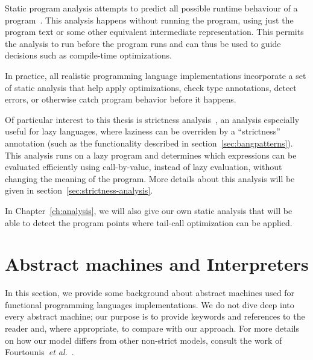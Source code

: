 \documentclass[diploma]{softlab-thesis}
\begin{document}


Static program analysis attempts to predict all possible runtime
behaviour of a program~\cite{Nielson:2010:PPA:1965094}. This analysis
happens without running the program, using just the program text or
some other equivalent intermediate representation. This permits the analysis to
run before the program runs and can thus be used to guide decisions
such as compile-time optimizations.

In practice, all realistic programming language implementations
incorporate a set of static analysis that help apply optimizations,
check type annotations, detect errors, or otherwise catch program
behavior before it happens.

Of particular interest to this thesis is strictness
analysis~\cite{PeytonJones:1991:UVF:645420.652528,Holdermans:2010:MSM:2088270.2088274},
an analysis especially useful for lazy languages, where laziness can
be overriden by a ``strictness'' annotation (such as the functionality
described in section~\ref{sec:bangpatterns}). This analysis runs on a
lazy program and determines which expressions can be evaluated
efficiently using call-by-value, instead of lazy evaluation, without
changing the meaning of the program. More details about this analysis will be given in section~\ref{sec:strictness-analysis}.


In Chapter~\ref{ch:analysis}, we will also give our own static
analysis that will be able to detect the program points where
tail-call optimization can be applied.

\section{Abstract machines and Interpreters}
\label{sec:abstract-machines}

In this section, we provide some background about abstract machines
used for functional programming languages implementations.  We do not
dive deep into every abstract machine; our purpose is to provide
keywords and references to the reader and, where appropriate, to
compare with our approach. For more details on how our model differs
from other non-strict models, consult the work of
Fourtounis~\emph{et al.}~\cite{Fourtounis:2013:GIT:2769663.2769674,Fourtounis14}.
\end{document}
